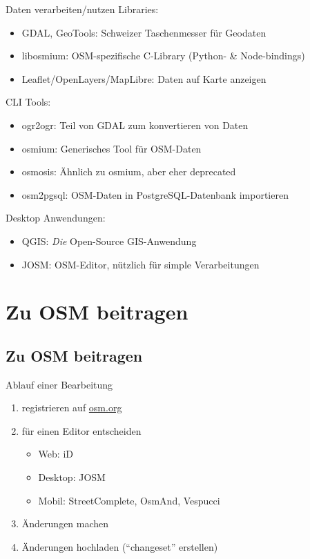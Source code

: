 \documentclass{beamer}
\begin{document}
			\begin{frame}{Daten verarbeiten/nutzen}
				Libraries:
				\begin{itemize}
					\item GDAL, GeoTools: Schweizer Taschenmesser für Geodaten
					\item libosmium: OSM-spezifische C-Library (Python- \& Node-bindings)
					\item Leaflet/OpenLayers/MapLibre: Daten auf Karte anzeigen
				\end{itemize}
				\pause
				CLI Tools:
				\begin{itemize}
					\item ogr2ogr: Teil von GDAL zum konvertieren von Daten
					\item osmium: Generisches Tool für OSM-Daten
					\item osmosis: Ähnlich zu osmium, aber eher deprecated
					\item osm2pgsql: OSM-Daten in PostgreSQL-Datenbank importieren
				\end{itemize}
				\pause
				Desktop Anwendungen:
				\begin{itemize}
					\item QGIS: \textit{Die} Open-Source GIS-Anwendung
					\item JOSM: OSM-Editor, nützlich für simple Verarbeitungen
				\end{itemize}
			\end{frame}

	\section{Zu OSM beitragen}
	
		\begin{frame}
			\tableofcontents[currentsection]
		\end{frame}
		
		\subsection{Zu OSM beitragen}
		
			\begin{frame}{Ablauf einer Bearbeitung}
				\begin{enumerate}
					\item registrieren auf \href{https://www.openstreetmap.org/user/new}{osm.org}\pause
					\item für einen Editor entscheiden
					\begin{itemize}
						\item Web: iD
						\item Desktop: JOSM
						\item Mobil: StreetComplete, OsmAnd, Vespucci
					\end{itemize}\pause
					\item Änderungen machen\pause
					\item Änderungen hochladen (\enquote{changeset} erstellen)
				\end{enumerate}
			\end{frame}
			
\end{document}

